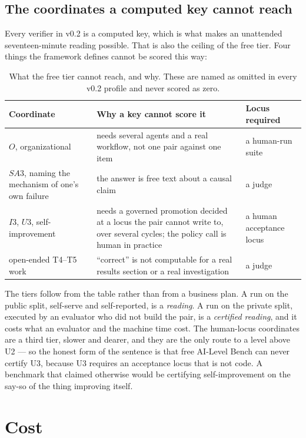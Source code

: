 \subsection{The coordinates a computed key cannot reach}

Every verifier in v0.2 is a computed key, which is what makes an unattended seventeen-minute reading possible. That is also the ceiling of the free tier. Four things the framework defines cannot be scored this way:

\begin{table}[!htbp]
\centering\small
\begin{tabularx}{\textwidth}{@{}>{\raggedright\arraybackslash}p{3.2cm}Y>{\raggedright\arraybackslash}p{2.4cm}@{}}
\toprule
Coordinate & Why a key cannot score it & Locus required \\
\midrule
$O$, organizational & needs several agents and a real workflow, not one pair against one item & a human-run suite \\
$SA3$, naming the mechanism of one's own failure & the answer is free text about a causal claim & a judge \\
$I3$, $U3$, self-improvement & needs a governed promotion decided at a locus the pair cannot write to, over several cycles; the policy call is human in practice & a human acceptance locus \\
open-ended T4--T5 work & ``correct'' is not computable for a real results section or a real investigation & a judge \\
\bottomrule
\end{tabularx}
\caption{What the free tier cannot reach, and why. These are named as omitted in every v0.2 profile and never scored as zero.}
\label{tab:human}
\end{table}

The tiers follow from the table rather than from a business plan. A run on the public split, self-serve and self-reported, is a \emph{reading}. A run on the private split, executed by an evaluator who did not build the pair, is a \emph{certified reading}, and it costs what an evaluator and the machine time cost. The human-locus coordinates are a third tier, slower and dearer, and they are the only route to a level above U2 --- so the honest form of the sentence is that free AI-Level Bench can never certify U3, because U3 requires an acceptance locus that is not code. A benchmark that claimed otherwise would be certifying self-improvement on the say-so of the thing improving itself.

\section{Cost}\label{sec:cost}

